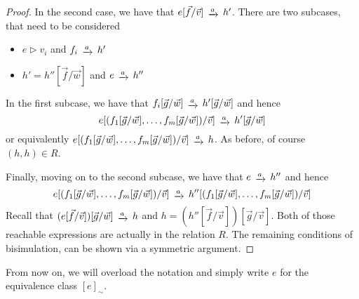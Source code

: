 \begin{proof}
	In the second case, we have that $e[\vec{f}/\vec{v}] \tr{a} h'$. There are two subcases, that need to be considered
	\begin{itemize}
		\item $e \rhd v_i$ and $f_i \tr{a} h'$
		\item $h' = h''[\vec{f}/ \vec{w}]$ and $e \tr{a} h''$ 
	\end{itemize}
	In the first subcase, we have that $f_i[\vec{g}/ \vec{w}] \tr{a} h'[\vec{g}/\vec{w}]$ and hence $$e[(f_1[\vec{g}/ \vec{w}], \dots, f_m[\vec{g}/ \vec{w}])/\vec{v}] \tr{a} h'[\vec{g}/\vec{w}]$$ or equivalently $e[(f_1[\vec{g}/ \vec{w}], \dots, f_m[\vec{g}/ \vec{w}])/\vec{v}] \tr{a} h$. As before, of course $(h,h) \in R$. 
	
	Finally, moving on to the second subcase, we have that $e \tr{a} h''$ and hence $$e[(f_1[\vec{g}/ \vec{w}], \dots, f_m[\vec{g}/ \vec{w}])/\vec{v}] \tr{a} h''[(f_1[\vec{g}/ \vec{w}], \dots, f_m[\vec{g}/ \vec{w}])/\vec{v}]$$ Recall that $(e[\vec{f}/ \vec{v}])[\vec{g}/\vec{w}] \tr{a} h$ and $h = (h''[\vec{f}/\vec{v}])[\vec{g}/\vec{v}]$. Both of those reachable expressions are actually in the relation $R$. The remaining conditions of bisimulation, can be shown via a symmetric argument. 
\end{proof}
From now on, we will overload the notation and simply write $e$ for the equivalence class $[e]_{\sim}$. 

